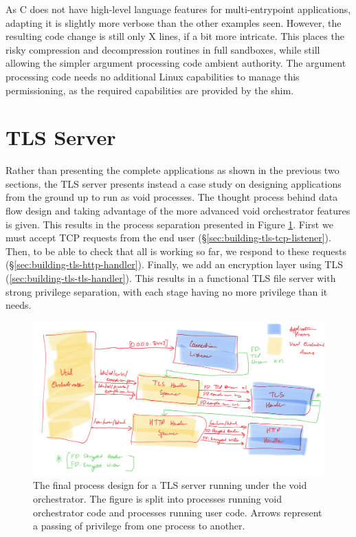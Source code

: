 \documentclass[12pt,a4paper,twoside]{report}
\begin{document}
As C does not have high-level language features for multi-entrypoint applications, adapting it is slightly more verbose than the other examples seen. However, the resulting code change is still only X lines, if a bit more intricate. This places the risky compression and decompression routines in full sandboxes, while still allowing the simpler argument processing code ambient authority. The argument processing code needs no additional Linux capabilities to manage this permissioning, as the required capabilities are provided by the shim.

\section{TLS Server}
\label{sec:building-tls}

Rather than presenting the complete applications as shown in the previous two sections, the TLS server presents instead a case study on designing applications from the ground up to run as void processes. The thought process behind data flow design and taking advantage of the more advanced void orchestrator features is given. This results in the process separation presented in Figure \ref{fig:tls-server-processes}. First we must accept TCP requests from the end user (§\ref{sec:building-tls-tcp-listener}). Then, to be able to check that all is working so far, we respond to these requests (§\ref{sec:building-tls-http-handler}). Finally, we add an encryption layer using TLS (\ref{sec:building-tls-tls-handler}). This results in a functional TLS file server with strong privilege separation, with each stage having no more privilege than it needs.

\begin{figure}
    \label{fig:tls-server-processes}
    \caption{The final process design for a TLS server running under the void orchestrator. The figure is split into processes running void orchestrator code and processes running user code. Arrows represent a passing of privilege from one process to another.}

    \centering
    \includegraphics[width=\columnwidth]{figures/tls-server-splitting.png}
\end{figure}
\end{document}
